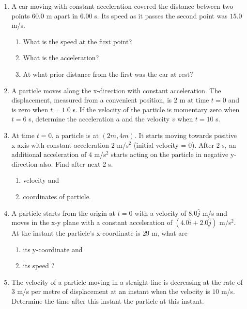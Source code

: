 \documentclass{article}
\begin{document}
\begin{enumerate}
\item A car moving with constant acceleration covered the distance between two points \( 60.0 \) m apart in \( 6.00 \) s. Its speed as it passes the second point was \( 15.0 \) m/s.
\begin{enumerate}
    \item What is the speed at the first point?
    \item What is the acceleration?
    \item At what prior distance from the first was the car at rest?
\end{enumerate}

\item A particle moves along the x-direction with constant acceleration. The displacement, measured from a convenient position, is \( 2 \) m at time \( t = 0 \) and is zero when \( t = 1.0 \) s. If the velocity of the particle is momentary zero when \( t = 6 \) s, determine the acceleration \( a \) and the velocity \( v \) when \( t = 10 \) s.

\item At time \( t = 0 \), a particle is at \( (2m, 4m) \). It starts moving towards positive x-axis with constant acceleration \( 2 \) m/s\(^2\) (initial velocity = 0). After \( 2 \) s, an additional acceleration of \( 4 \) m/s\(^2\) starts acting on the particle in negative y-direction also. Find after next \( 2 \) s.
\begin{enumerate}
    \item velocity and
    \item coordinates of particle.
\end{enumerate}

\item A particle starts from the origin at \( t = 0 \) with a velocity of \( 8.0 \hat{j} \) m/s and moves in the x-y plane with a constant acceleration of \( (4.0 \hat{i} + 2.0 \hat{j}) \) m/s\(^2\). At the instant the particle’s x-coordinate is \( 29 \) m, what are
\begin{enumerate}
    \item its y-coordinate and
    \item its speed ?
\end{enumerate}

\item The velocity of a particle moving in a straight line is decreasing at the rate of \( 3 \) m/s per metre of displacement at an instant when the velocity is \( 10 \) m/s. Determine the time after this instant the particle at this instant.


\end{enumerate}
\end{document}
